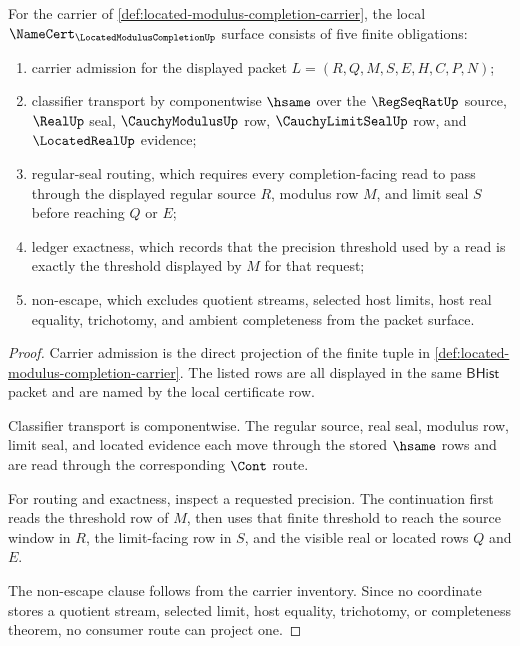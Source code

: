 \begin{theorem}
\label{thm:located-modulus-completion-namecert-obligations}
For the carrier of \autoref{def:located-modulus-completion-carrier}, the local $\NameCert_{\LocatedModulusCompletionUp}$ surface consists of five finite obligations:
\begin{enumerate}
\item carrier admission for the displayed packet $L=(R,Q,M,S,E,H,C,P,N)$;
\item classifier transport by componentwise $\hsame$ over the $\RegSeqRatUp$ source, $\RealUp$ seal, $\CauchyModulusUp$ row, $\CauchyLimitSealUp$ row, and $\LocatedRealUp$ evidence;
\item regular-seal routing, which requires every completion-facing read to pass through the displayed regular source $R$, modulus row $M$, and limit seal $S$ before reaching $Q$ or $E$;
\item ledger exactness, which records that the precision threshold used by a read is exactly the threshold displayed by $M$ for that request;
\item non-escape, which excludes quotient streams, selected host limits, host real equality, trichotomy, and ambient completeness from the packet surface.
\end{enumerate}
\end{theorem}
\begin{proof}
Carrier admission is the direct projection of the finite tuple in \autoref{def:located-modulus-completion-carrier}. The listed rows are all displayed in the same $\mathsf{BHist}$ packet and are named by the local certificate row.

Classifier transport is componentwise. The regular source, real seal, modulus row, limit seal, and located evidence each move through the stored $\hsame$ rows and are read through the corresponding $\Cont$ route.

For routing and exactness, inspect a requested precision. The continuation first reads the threshold row of $M$, then uses that finite threshold to reach the source window in $R$, the limit-facing row in $S$, and the visible real or located rows $Q$ and $E$.

The non-escape clause follows from the carrier inventory. Since no coordinate stores a quotient stream, selected limit, host equality, trichotomy, or completeness theorem, no consumer route can project one.
\end{proof}

